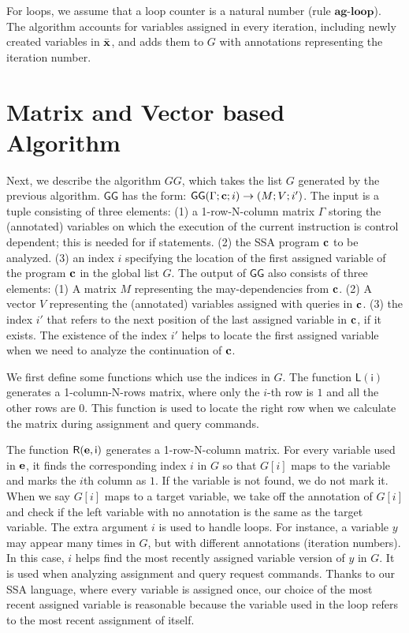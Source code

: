 For loops, we assume that a loop counter is a natural number (rule 
$\textbf{ag-loop}$). The algorithm accounts for variables assigned in every iteration, including newly created variables in $\bar{{\bf{{x}}}}$, and adds them to $G$ with annotations representing the iteration number. 

\section{Matrix and Vector based Algorithm}
\label{sec:adapt-matrix}
Next, we describe the algorithm $GG$, which takes the list $G$ generated by the previous algorithm. $\mathsf{GG}$ has the form: $ \mathsf{GG}{(\Gamma; {\bf{{c}}} ;i )}\to {( M; V;  i' )} $. The input is a tuple consisting of three elements: (1) a 1-row-N-column matrix $\Gamma$ storing the (annotated) variables on which the execution of the current instruction is control dependent; this is needed for if statements. (2) the SSA program ${\bf{{c}}}$ to be analyzed. (3) an index $i$ specifying the location of the first assigned variable of the program ${\bf{{c}}}$ in the global list $G$. The output of $\mathsf{GG}$ also consists of three elements: (1) A matrix $M$ representing the may-dependencies from ${\bf{{c}}}$. (2) A vector $V$ representing the (annotated) variables assigned with queries in ${\bf{{c}}}$. (3) the index $i'$ that refers to the next position of the last assigned variable in ${\bf{{c}}}$, if it exists. The existence of the index $i'$ helps to locate the first assigned variable when we need to analyze the continuation of ${\bf{{c}}}$.  

We first define some functions which use the indices in $G$. 
The function $\mathsf{L(i)}$ generates a 1-column-N-rows  matrix, where only the $i$-th row is $1$ and all the other rows are $0$. This function is used to locate the right row when we calculate the matrix during assignment and query commands. 

The function $\mathsf{R({\bf{{e}}}, i)}$ generates a 1-row-N-column matrix. For every variable used in ${\bf{{e}}}$, it finds the corresponding index $i$ in $G$ so that $G[i]$ maps to the variable and marks the $i$th column as $1$. If the variable is not found, we do not mark it. When we say $G[i]$ maps to a target variable, we take off the annotation of $G[i]$ and check if the left variable with no annotation is the same as the target variable. The extra argument $i$ is used to handle loops. For instance, a variable $y$ may appear many times in $G$, but with different annotations (iteration numbers). In this case, $i$ helps find the most recently assigned variable version of $y$ in $G$. It is used when analyzing assignment and query request commands. Thanks to our SSA language, where every variable is assigned once, our choice of the most recent assigned variable is reasonable because the variable used in the loop refers to the most recent assignment of itself. 


